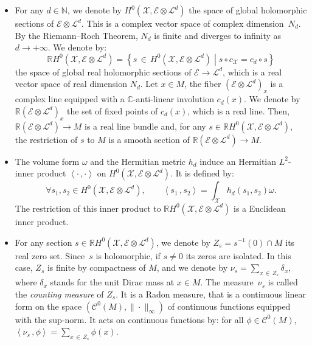 \documentclass[AHL,Unicode,longabstracts,published]{cedram}
\newcommand{\E}{\mathcal{E}}
\newcommand{\X}{\mathcal{X}}
\renewcommand{\L}{\mathcal{L}}
\newcommand{\clC}{\mathcal{C}}
\newcommand{\C}{\mathbb{C}}
\newcommand{\N}{\mathbb{N}}
\newcommand{\R}{\mathbb{R}}
\newcommand{\prsc}[2]{\left\langle #1\,, #2 \right\rangle}
\renewcommand{\H}{H^0(\X,\E \otimes \L^d)}
\let\oldforall\forall
\renewcommand*{\forall}{\mathrel{\oldforall}}
\begin{document}
\begin{itemize}
\item For any $d \in \N$, we denote by $\H$ the space of global holomorphic sections of $\E \otimes \L^d$. This is a complex vector space of complex dimension~$N_d$. By the Riemann--Roch Theorem, $N_d$ is finite and diverges to infinity as $d \to +\infty$. We denote by:
\[
\R H^0\left(\X,\E \otimes \L^d\right) = \left\{s\,\in\,H^0\left(\X,\E \otimes \L^d\right) \middle| s \circ c_\X = c_d \circ s \right\}
\]
the space of global real holomorphic sections of $\E \to \L^d$, which is a real vector space of real dimension $N_d$. Let $x \in M$, the fiber $(\E \otimes \L^d)_x$ is a complex line equipped with a $\C$-anti-linear involution $c_d(x)$. We denote by $\R(\E \otimes \L^d)_x$ the set of fixed points of $c_d(x)$, which is a real line. Then, $\R(\E \otimes \L^d) \to M$ is a real line bundle and, for any $s \in \R\H$, the restriction of $s$ to $M$ is a smooth section of $\R(\E \otimes \L^d) \to M$.

\item The volume form $\omega$ and the Hermitian metric $h_d$ induce an Hermitian $L^2$-inner product $\prsc{\cdot}{\cdot}$ on $\H$. It is defined by:
\begin{equation}\label{eq def L2 inner product}
\forall s_1,s_2 \in H^0\left(\X,\E \otimes \L^d\right), \qquad \prsc{s_1}{s_2}=\int_\X h_d(s_1,s_2) \omega.
\end{equation}
The restriction of this inner product to $\R\H$ is a Euclidean inner product.

\item For any section $s \in \R\H$, we denote by $Z_s = s^{-1}(0) \cap M$ its real zero set. Since~$s$ is holomorphic, if $s \neq 0$ its zeros are isolated. In this case, $Z_s$ is finite by compactness of $M$, and we denote by $\nu_s = \sum_{x\,\in\, Z_s} \delta_x$, where $\delta_x$ stands for the unit Dirac mass at $x \in M$. The measure~$\nu_s$ is called the \emph{counting measure} of $Z_s$. It is a Radon measure, that is a continuous linear form on the space $(\clC^0(M), \|\cdot\|_\infty)$ of continuous functions equipped with the sup-norm. It acts on continuous functions by: for all $\phi \in \clC^0(M)$, $\prsc{\nu_s}{\phi} = \sum_{x\,\in\,Z_s} \phi(x)$.
\end{itemize}
\end{document}
